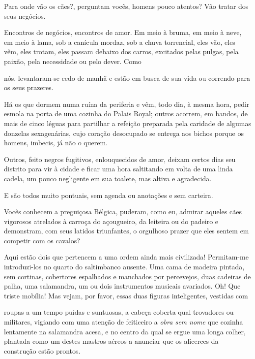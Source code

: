 Para onde vão os cães?, perguntam vocês, homens pouco atentos? Vão tratar dos seus negócios.

Encontros de negócios, encontros de amor. Em meio à bruma, em meio à
neve, em meio à lama, sob a canícula mordaz, sob a chuva torrencial,
eles vão, eles vêm, eles trotam, eles passam debaixo dos carros, excitados
pelas pulgas, pela paixão, pela necessidade ou pelo dever. Como

\quebra

\noindent{}nós,
levantaram-se cedo de manhã e estão em busca de sua vida ou correndo para os
seus prazeres.

Há os que dormem numa ruína da periferia e vêm, todo dia, à mesma
hora, pedir esmola na porta de uma cozinha do Palais Royal;
outros acorrem, em bandos, de mais de cinco léguas para
partilhar a refeição preparada pela caridade de algumas donzelas
sexagenárias, cujo coração desocupado se entrega aos bichos porque
os homens, imbecis, já não o querem.

Outros, feito negros fugitivos, enlouquecidos de amor, deixam certos
dias seu distrito para vir à cidade e ficar uma hora saltitando em volta de
uma linda cadela, um pouco negligente em sua toalete, mas
altiva e agradecida.

E são todos muito pontuais, sem agenda ou anotações e sem
carteira.

Vocês conhecem a preguiçosa Bélgica, puderam, como eu, admirar
aqueles cães vigorosos atrelados à carroça do açougueiro, da leiteira ou
do padeiro e demonstram, com seus latidos triunfantes, o orgulhoso prazer
que eles sentem em competir com os cavalos?

Aqui estão dois que pertencem a uma ordem ainda mais civilizada!
Permitam-me introduzi-los no quarto do saltimbanco ausente. Uma
cama de madeira pintada, sem cortinas, cobertores espalhados e
manchados por percevejos, duas cadeiras de palha, uma salamandra, um ou
dois instrumentos musicais avariados. Oh! Que triste mobília! Mas
vejam, por favor, essas duas figuras inteligentes, vestidas com \linebreak

\quebra

\noindent{}roupas
a um tempo puídas e suntuosas, a cabeça coberta qual trovadores ou
militares, vigiando com uma atenção de feiticeiro a \textit{obra sem nome}
que cozinha lentamente na salamandra acesa, e no centro da qual
se ergue uma longa colher, plantada como um destes mastros aéreos a
anunciar que os alicerces da construção estão prontos.

